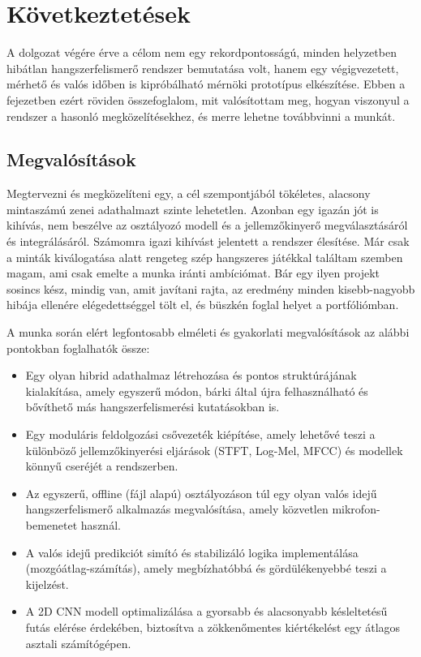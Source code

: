 \chapter{Következtetések}

A dolgozat végére érve a célom nem egy rekordpontosságú, minden helyzetben
hibátlan hangszerfelismerő rendszer bemutatása volt, hanem egy végigvezetett,
mérhető és valós időben is kipróbálható mérnöki prototípus elkészítése. Ebben
a fejezetben ezért röviden összefoglalom, mit valósítottam meg, hogyan
viszonyul a rendszer a hasonló megközelítésekhez, és merre lehetne továbbvinni
a munkát.

\section{Megvalósítások}
Megtervezni és megközelíteni egy, a cél szempontjából tökéletes, alacsony mintaszámú zenei adathalmazt szinte lehetetlen. Azonban egy igazán jót is kihívás, nem beszélve az osztályozó modell és a jellemzőkinyerő megválasztásáról és integrálásáról. Számomra igazi kihívást jelentett a rendszer élesítése. Már csak a minták kiválogatása alatt rengeteg szép hangszeres játékkal találtam szemben magam, ami csak emelte a munka iránti ambíciómat. Bár egy ilyen projekt sosincs kész, mindig van, amit javítani rajta, az eredmény minden kisebb-nagyobb hibája ellenére elégedettséggel tölt el, és büszkén foglal helyet a portfóliómban.

A munka során elért legfontosabb elméleti és gyakorlati megvalósítások az alábbi pontokban foglalhatók össze:
\begin{itemize}
    \item Egy olyan hibrid adathalmaz létrehozása és pontos struktúrájának kialakítása, amely egyszerű módon, bárki által újra felhasználható és bővíthető más hangszerfelismerési kutatásokban is.
    \item Egy moduláris feldolgozási csővezeték kiépítése, amely lehetővé teszi a különböző jellemzőkinyerési eljárások (STFT, Log-Mel, MFCC) és modellek könnyű cseréjét a rendszerben.
    \item Az egyszerű, offline (fájl alapú) osztályozáson túl egy olyan valós idejű hangszerfelismerő alkalmazás megvalósítása, amely közvetlen mikrofon-bemenetet használ.
    \item A valós idejű predikciót simító és stabilizáló logika implementálása (mozgóátlag-számítás), amely megbízhatóbbá és gördülékenyebbé teszi a kijelzést.
    \item A 2D CNN modell optimalizálása a gyorsabb és alacsonyabb késleltetésű futás elérése érdekében, biztosítva a zökkenőmentes kiértékelést egy átlagos asztali számítógépen.
\end{itemize}

